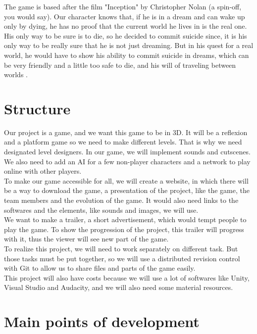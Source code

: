 \documentclass[twoside,12pt]{report}	%
\begin{document}
		The game is based after the film "Inception" by Christopher Nolan (a spin-off, you would say). Our character knows that, if he is in a dream and can wake up only by dying, he has no proof that the current world he lives in is the real one. His only way to be sure is to die, so he decided to commit suicide since, it is his only way to be really sure that he is not just dreaming. But in his quest for a real world, he would have to show his ability to commit suicide in dreams, which can be very friendly and a little too safe to die, and his will of traveling between worlds .

	\chapter{Structure}

		Our project is a game, and we want this game to be in 3D. It will be a reflexion and a platform game so we need to make different levels. That is why we need designated level designers. In our game, we will implement sounds and cutscenes. We also need to add an AI for a few non-player characters and a network to play online with other players.
		\\
		To make our game accessible for all, we will create a website, in which there will be a way to download the game, a presentation of the project, like the game, the team members and the evolution of the game. It would also need links to the softwares and the elements, like sounds and images, we will use.
		\\
		We want to make a trailer, a short advertisement, which would tempt people to play the game. To show the progression of the project, this trailer will progress with it, thus the viewer will see new part of the game.
		\\
		To realize this project, we will need to work separately on different task. But those tasks must be put together, so we will use a distributed revision control with Git to allow us to share files and parts of the game easily.
		\\
		This project will also have costs because we will use a lot of softwares like Unity, Visual Studio and Audacity, and we will also need some material resources.

	\chapter{Main points of development}
\end{document}
